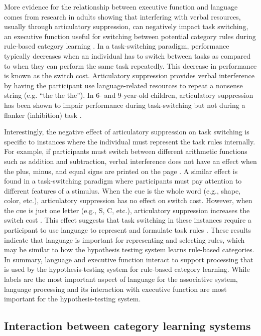 \documentclass[../dissertation.tex]{subfiles}
\begin{document}
	More evidence for the relationship between executive function and language comes from research in adults showing that interfering with verbal resources, usually through articulatory suppression, can negatively impact task switching, an executive function useful for switching between potential category rules during rule-based category learning \citep{Baddeley2001,Emerson2003}. In a task-switching paradigm, performance typically decreases when an individual has to switch between tasks as compared to when they can perform the same task repeatedly. This decrease in performance is known as the switch cost. Articulatory suppression provides verbal interference by having the participant use language-related resources to repeat a nonsense string (e.g. “the the the”). In 6- and 9-year-old children, articulatory suppression has been shown to impair performance during task-switching but not during a flanker (inhibition) task \citep{Fatzer2012}. \par
	Interestingly, the negative effect of articulatory suppression on task switching is specific to instances where the individual must represent the task rules internally. For example, if participants must switch between different arithmetic functions such as addition and subtraction, verbal interference does not have an effect when the plus, minus, and equal signs are printed on the page \citep{Baddeley2001}. A similar effect is found in a task-switching paradigm where participants must pay attention to different features of a stimulus. When the cue is the whole word (e.g., shape, color, etc.), articulatory suppression has no effect on switch cost. However, when the cue is just one letter (e.g., S, C, etc.), articulatory suppression increases the switch cost \citep{Miyake2004}. This effect suggests that task switching in these instances require a participant to use language to represent and formulate task rules \citep{Cragg2010}. These results indicate that language is important for representing and selecting rules, which may be similar to how the hypothesis testing system learns rule-based categories. In summary, language and executive function interact to support processing that is used by the hypothesis-testing system for rule-based category learning. While labels are the most important aspect of language for the associative system, language processing and its interaction with executive function are most important for the hypothesis-testing system.
	
\subsection{Interaction between category learning systems}\label{order_intro}
\end{document}
